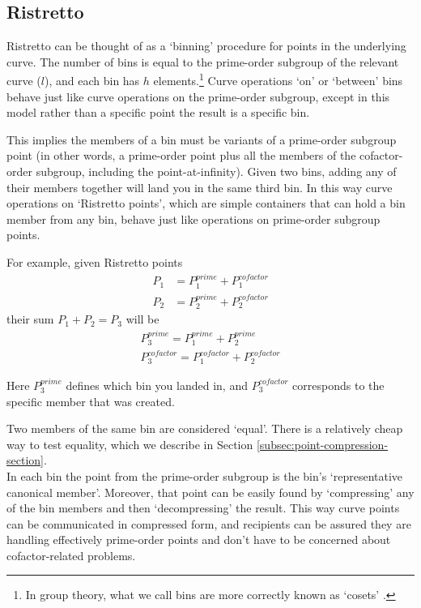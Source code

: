 \subsection{Ristretto}
\label{subsec:ristretto}

Ristretto can be thought of as a `binning' procedure for points in the underlying curve. The number of bins is equal to the prime-order subgroup of the relevant curve ($l$), and each bin has $h$ elements.\footnote{In group theory, what we call bins are more correctly known as `cosets' \cite{coset-wikibooks}.} Curve operations `on' or `between' bins behave just like curve operations on the prime-order subgroup, except in this model rather than a specific point the result is a specific bin.

This implies the members of a bin must be variants of a prime-order subgroup point (in other words, a prime-order point plus all the members of the cofactor-order subgroup, including the point-at-infinity). Given two bins, adding any of their members together will land you in the same third bin. In this way curve operations on `Ristretto points', which are simple containers that can hold a bin member from any bin, behave just like operations on prime-order subgroup points.

For example, given Ristretto points
\begin{align*}
    P_1 &= P^{prime}_1 + P^{cofactor}_1 \\
    P_2 &= P^{prime}_2 + P^{cofactor}_2
\end{align*}
their sum $P_1 + P_2 = P_3$ will be
\begin{align*}
    P^{prime}_3 = P^{prime}_1 + P^{prime}_2 \\
    P^{cofactor}_3 = P^{cofactor}_1 + P^{cofactor}_2
\end{align*}

Here $P^{prime}_3$ defines which bin you landed in, and $P^{cofactor}_3$ corresponds to the specific member that was created.

Two members of the same bin are considered `equal'. There is a relatively cheap way to test equality, which we describe in Section \ref{subsec:point-compression-section}.\\

In each bin the point from the prime-order subgroup is the bin's `representative canonical member'. Moreover, that point can be easily found by `compressing' any of the bin members and then `decompressing' the result. This way curve points can be communicated in compressed form, and recipients can be assured they are handling effectively prime-order points and don't have to be concerned about cofactor-related problems.


